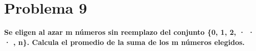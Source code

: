 \section*{Problema 9}
\textbf{Se eligen al azar m números sin reemplazo del conjunto \{0, 1, 2, · · · , n\}. Calcula el promedio de la suma de los m números elegidos.}
